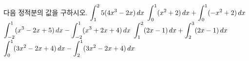 다음 정적분의 값을 구하시오.
 $\displaystyle\int_{1}^{2}5(4x^3-2x)\mkern3mu dx$
 $\displaystyle\int_{0}^{1}(x^2+2)\mkern3mu dx+\int_{0}^{1}(-x^2+2)\mkern3mu dx$
 $\displaystyle\int_{-2}^{1}(x^3-2x+5)\mkern3mu dx-\int_{-2}^{1}(x^3+2x+4)\mkern3mu dx$
 $\displaystyle\int_{1}^{2}(2x-1)\mkern3mu dx+\int_{2}^{3}(2x-1)\mkern3mu dx$
 $\displaystyle\int_{0}^{1}(3x^2-2x+4)\mkern3mu dx-\int_{2}^{1}(3x^2-2x+4)\mkern3mu dx$
